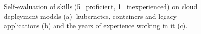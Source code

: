 \documentclass[../main.tex]{subfiles}
\begin{document}
    \begin{figure}[h]
        \centering
        \hfill
        \hfill
        \captionsetup{justification=centering}
        \caption{
            Self-evaluation of skills (5=proficient, 1=inexperienced) on \gls{cloud} deployment models (a), \gls{kubernetes}, containers and legacy applications (b) and the years of experience working in \acrshort{it} (c).
        }
        \label{fig:res_group_skill}
    \end{figure}
\end{document}
